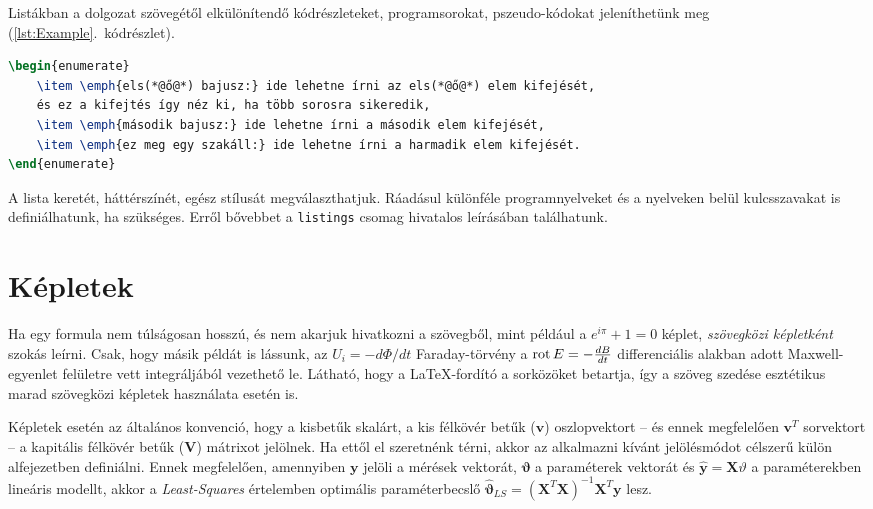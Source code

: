 Listákban a dolgozat szövegétől elkülönítendő kódrészleteket, programsorokat, pszeudo-kódokat jeleníthetünk meg (\ref{lst:Example}.~kódrészlet).
\begin{lstlisting}[language=tex,caption=A fenti számozott felsorolás \LaTeX-forráskódja,label=lst:Example]
\begin{enumerate}
	\item \emph{els(*@ő@*) bajusz:} ide lehetne írni az els(*@ő@*) elem kifejését,
	és ez a kifejtés így néz ki, ha több sorosra sikeredik,
	\item \emph{második bajusz:} ide lehetne írni a második elem kifejését,
	\item \emph{ez meg egy szakáll:} ide lehetne írni a harmadik elem kifejését.
\end{enumerate}
\end{lstlisting}
A lista keretét, háttérszínét, egész stílusát megválaszthatjuk. Ráadásul különféle programnyelveket és a nyelveken belül kulcsszavakat is definiálhatunk, ha szükséges. Erről bővebbet a \verb+listings+ csomag hivatalos leírásában találhatunk.

\section{Képletek}
Ha egy formula nem túlságosan hosszú, és nem akarjuk hivatkozni a szövegből, mint például a $e^{i\pi}+1=0$ képlet, \emph{szövegközi képletként} szokás leírni. Csak, hogy másik példát is lássunk, az $U_i=-d\Phi/dt$ Faraday-törvény a $\operatorname{rot} E=-\frac{dB}{dt}$ differenciális alakban adott Maxwell-egyenlet felületre vett integráljából vezethető le. Látható, hogy a \LaTeX-fordító a sorközöket betartja, így a szöveg szedése esztétikus marad szövegközi képletek használata esetén is.

Képletek esetén az általános konvenció, hogy a kisbetűk skalárt, a kis félkövér betűk ($\mathbf{v}$) oszlopvektort -- és ennek megfelelően $\mathbf{v}^T$ sorvektort -- a kapitális félkövér betűk ($\mathbf{V}$) mátrixot jelölnek. Ha ettől el szeretnénk térni, akkor az alkalmazni kívánt jelölésmódot célszerű külön alfejezetben definiálni. Ennek megfelelően, amennyiben $\mathbf{y}$ jelöli a mérések vektorát, $\mathbf{\vartheta}$ a paraméterek vektorát és $\hat{\mathbf{y}}=\mathbf{X}\vartheta$ a paraméterekben lineáris modellt, akkor a \emph{Least-Squares} értelemben optimális paraméterbecslő $\hat{\mathbf{\vartheta}}_{LS}=(\mathbf{X}^T\mathbf{X})^{-1}\mathbf{X}^T\mathbf{y}$ lesz.

